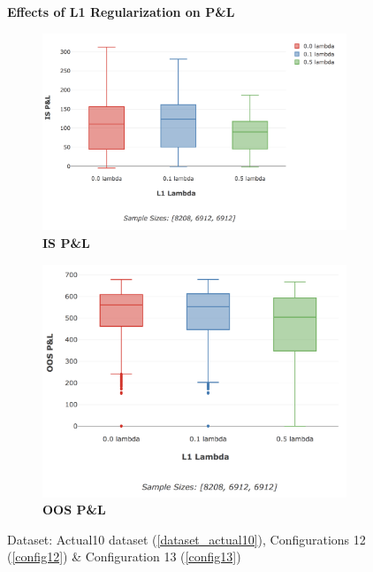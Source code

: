 \documentclass[a4paper,11pt,oneside]{article}
\theoremstyle{plain}
\theoremstyle{definition}
\begin{document}
	\begin{figure}[H]
		\centering
		\textbf{Effects of L1 Regularization on P\&L}
		\begin{subfigure}{.5\textwidth}
			\includegraphics[scale=0.3]{images/results/complexity/is_actual_pl_reg.png}
			\caption{\textbf{IS P\&L} }
			\label{figure-is_actual_pl_reg}
		\end{subfigure}%
		\begin{subfigure}{.5\textwidth}
			\includegraphics[scale=0.3]{images/results/complexity/oos_actual_pl_reg.png}
			\caption{\textbf{OOS P\&L} }
			\label{figure-oos_actual_pl_reg}
		\end{subfigure}
		\caption[Effects of L1 Regularization on P\&L]
		{Dataset: Actual10 dataset (\ref{dataset_actual10}),  Configurations 12 (\ref{config12}) \& Configuration 13 (\ref{config13})
}
\end{figure}
\end{document}
